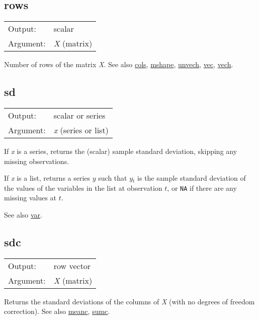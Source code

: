 \subsection{rows}
\hypertarget{func-rows}{}

\begin{tabular}{ll}
Output:     & scalar\\
Argument:   & \textsl{X} (matrix)\\
\end{tabular}

	  Number of rows of the matrix \textsl{X}.  
	  See also \hyperlink{func-cols}{cols}, \hyperlink{func-mshape}{mshape}, \hyperlink{func-unvech}{unvech}, \hyperlink{func-vec}{vec}, \hyperlink{func-vech}{vech}.

\subsection{sd}
\hypertarget{func-sd}{}

\begin{tabular}{ll}
Output:     & scalar or series\\
Argument:   & \textsl{x} (series or list)\\
\end{tabular}

	  If \textsl{x} is a series, returns the (scalar) sample
	  standard deviation, skipping any missing observations.

	  If \textsl{x} is a list, returns a series \ensuremath{y}
	  such that \ensuremath{y}\ensuremath{_{t}} is the sample standard
	  deviation of the values of the variables in the list at observation
	  \ensuremath{t}, or \texttt{NA} if there are any missing values at
	  \ensuremath{t}.

	  See also \hyperlink{func-var}{var}.

\subsection{sdc}
\hypertarget{func-sdc}{}

\begin{tabular}{ll}
Output:     & row vector\\
Argument:   & \textsl{X} (matrix)\\
\end{tabular}

	  Returns the standard deviations of the columns of
	  \textsl{X} (with no degrees of freedom correction). 
	  See also \hyperlink{func-meanc}{meanc}, \hyperlink{func-sumc}{sumc}.

